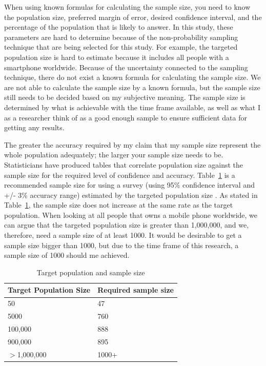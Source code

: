     When using known formulas for calculating the sample size, you need to know the population size, preferred margin of error, desired confidence interval, and the percentage of the population that is likely to answer. In this study, these parameters are hard to determine because of the non-probability sampling technique that are being selected for this study. For example, the targeted population size is hard to estimate because it includes all people with a smartphone worldwide. Because of the uncertainty connected to the sampling technique, there do not exist a known formula for calculating the sample size. We are not able to calculate the sample size by a known formula, but the sample size still needs to be decided based on my subjective meaning. The sample size is determined by what is achievable with the time frame available, as well as what I as a researcher think of as a good enough sample to ensure sufficient data for getting any results.

    The greater the accuracy required by my claim that my sample size represent the whole population adequately; the larger your sample size needs to be. Statisticians have produced tables that correlate population size against the sample size for the required level of confidence and accuracy. Table~\ref{tab:sampleSize} is a recommended sample size for using a survey (using 95\% confidence interval and +/- 3\% accuracy range) estimated by the targeted population size \cite{empiriske}. As stated in Table~\ref{tab:sampleSize}, the sample size does not increase at the same rate as the target population. When looking at all people that owns a mobile phone worldwide, we can argue that the targeted population size is greater than 1,000,000, and we, therefore, need a sample size of at least 1000. It would be desirable to get a sample size bigger than 1000, but due to the time frame of this research, a sample size of 1000 should me achieved.

      \begin{table}[H]
        \centering
        \begin{tabular}{| p{5cm} | p{5cm} |}
          \hline
          {\bf Target Population Size} & {\bf Required sample size} \\ \hline
          50 & 47 \\
          5000 & 760 \\ 
          100,000 & 888 \\
          900,000 & 895 \\ 
          $>$1,000,000 & 1000+ \\ \hline
        \end{tabular}
        \caption{Target population and sample size \cite{empiriske}}
        \label{tab:sampleSize}
      \end{table}

